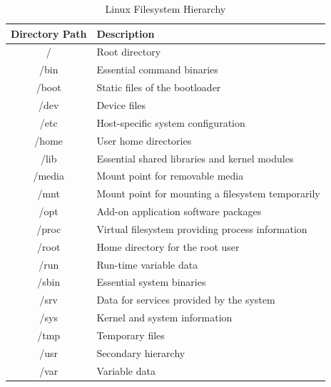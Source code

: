 \begin{table}[h!]
\caption{Linux Filesystem Hierarchy}
\begin{tabular}{ c l }
  \toprule
 Directory Path & Description \\
 \midrule
  / & Root directory \\
  /bin & Essential command binaries \\
  /boot & Static files of the bootloader \\
  /dev & Device files \\
  /etc & Host-specific system configuration \\
  /home & User home directories \\
  /lib & Essential shared libraries and kernel modules \\
  /media & Mount point for removable media \\
  /mnt & Mount point for mounting a filesystem temporarily \\
  /opt & Add-on application software packages \\
  /proc & Virtual filesystem providing process information \\
  /root & Home directory for the root user \\
  /run & Run-time variable data \\
  /sbin & Essential system binaries \\
  /srv & Data for services provided by the system \\
  /sys & Kernel and system information \\
  /tmp & Temporary files \\
  /usr & Secondary hierarchy \\
  /var & Variable data \\
  \bottomrule
\end{tabular}
\end{table}

